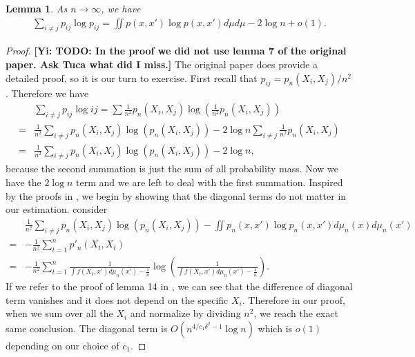 \documentclass[10pt]{article}
\newcommand{\gy}[1]{\textbf{\color{gred}[Yi: #1]}}
\newtheorem{lemma}{\bf Lemma}
\newenvironment{Proof of lemma}{\noindent{\bf Proof of Lemma}}{\hfill$\Box$\newline}
\newenvironment{Proof of claim}{\noindent{\bf Proof of claim}}{\hfill$\Box$\newline}
\newenvironment{Proof of theorem}{\noindent{\bf Proof of Theorem}}{\hfill\scriptsize{$\Box$}\newline}
\newenvironment{Proof of theorems}{\noindent{\bf Proof of Theorems}}{\hfill$\Box$\newline}
\newenvironment{Proof of proposition}{\noindent{\bf Proof of Proposition}}{\hfill$\Box$\newline}
\newenvironment{Proof of propositions}{\noindent{\bf Proof of Propositions}}{\hfill$\Box$\newline}
\newenvironment{Proof of exercise}{\noindent{\it Proof of Exercise:}}{\hfill$\Box$}
\numberwithin{equation}{section}
\begin{document}
\begin{lemma} \label{entropy_lemma_1}
    As $n \to \infty$, we have
    \begin{align}
        \sum_{i \neq j} p_{ij} \log p_{ij} = \iint p(x,x')\log p(x,x')d\mu d\mu - 2 \log n + o(1).
    \end{align}
\end{lemma}
\begin{proof}
    \gy{TODO: In the proof we did not use lemma 7 of the original paper. Ask Tuca what did I miss.}
    The original paper does provide a detailed proof, so it is our turn to exercise. First recall that $p_{ij} = p_n(X_i,X_j)/n^2$. Therefore we have
    \begin{align}
          & \sum_{i \neq j}p_{ij} \log{ij} = \sum \frac{1}{n^2}p_n(X_i,X_j)\log\left(\frac{1}{n^2}p_n(X_i,X_j)\right) \nonumber           \\
        = & \frac{1}{n^2} \sum_{i \neq j} p_n(X_i,X_j) \log (p_n(X_i,X_j)) - 2 \log n\sum_{i \neq j} \frac{1}{n^2} p_n(X_i,X_j) \nonumber \\
        = & \frac{1}{n^2} \sum_{i \neq j} p_n(X_i,X_j) \log (p_n(X_i,X_j)) - 2 \log n,
    \end{align}
    because the second summation is just the sum of all probability mass. Now we have the $2 \log n$ term and we are left to deal with the first summation. Inspired by the proofs in \cite{auffinger-tsne}, we begin by showing that the diagonal terms do not matter in our estimation. consider
    \begin{align}
          & \frac{1}{n^2} \sum_{i \neq j} p_n(X_i,X_j) \log (p_n(X_i,X_j)) - \iint p_n(x,x')\log p_n(x,x') d\mu_n(x)d\mu_n(x') \nonumber                     \\
        = & - \frac{1}{n^2}\sum_{t=1}^{n}p'_n(X_t,X_t) \nonumber                                                                                             \\
        = & - \frac{1}{n^2}\sum_{t=1}^{n} \frac{1}{\int f(X_t,x')d\mu_n(x') - \frac{1}{n}}\log\left(\frac{1}{\int f(X_t,x')d\mu_n(x') - \frac{1}{n}}\right).
    \end{align}
    If we refer to the proof of lemma 14 in \cite{auffinger-tsne}, we can see that the difference of diagonal term vanishes and it does not depend on the specific $X_i$. Therefore in our proof, when we sum over all the $X_i$ and normalize by dividing $n^2$, we reach the exact same conclusion. The diagonal term is $O(n^{4/c_1\delta^2 -1}\log n)$ which is $o(1)$ depending on our choice of $c_1$.


\end{proof}
\end{document}
